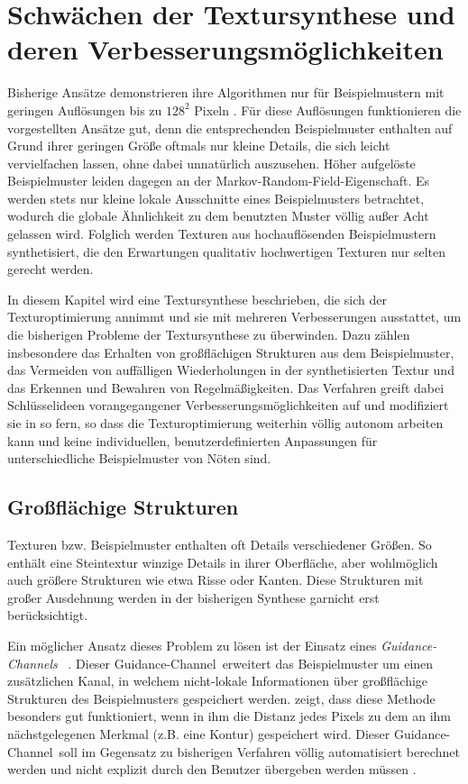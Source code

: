 \section{Schwächen der Textursynthese und deren Verbesserungsmöglichkeiten}

Bisherige Ansätze demonstrieren ihre Algorithmen nur für Beispielmustern mit geringen Auflösungen bis zu $128^2$ Pixeln \cite{SelfTuning}.
Für diese Auflösungen funktionieren die vorgestellten Ansätze gut, denn die entsprechenden Beispielmuster enthalten auf Grund ihrer geringen Größe oftmals nur kleine Details, die sich leicht vervielfachen lassen, ohne dabei unnatürlich auszusehen.
Höher aufgelöste Beispielmuster leiden dagegen an der \glqq Markov-Random-Field\grqq -Eigenschaft.
Es werden stets nur kleine lokale Ausschnitte eines Beispielmusters betrachtet, wodurch die globale Ähnlichkeit zu dem benutzten Muster völlig außer Acht gelassen wird.
Folglich werden Texturen aus hochauflösenden Beispielmustern synthetisiert, die den Erwartungen qualitativ hochwertigen Texturen nur selten gerecht werden.

In diesem Kapitel wird eine Textursynthese beschrieben, die sich der Texturoptimierung annimmt und sie mit mehreren Verbesserungen ausstattet, um die bisherigen Probleme der Textursynthese zu überwinden.
Dazu zählen insbesondere das Erhalten von großflächigen Strukturen aus dem Beispielmuster, das Vermeiden von auffälligen Wiederholungen in der synthetisierten Textur und das Erkennen und Bewahren von Regelmäßigkeiten.
Das Verfahren greift dabei Schlüsselideen vorangegangener Verbesserungsmöglichkeiten auf und modifiziert sie in so fern, so dass die Texturoptimierung weiterhin völlig autonom arbeiten kann und keine individuellen, benutzerdefinierten Anpassungen für unterschiedliche Beispielmuster von Nöten sind.

\subsection{Großflächige Strukturen}

Texturen bzw. Beispielmuster enthalten oft Details verschiedener Größen.
So enthält eine Steintextur winzige Details in ihrer Oberfläche, aber wohlmöglich auch größere Strukturen wie etwa Risse oder Kanten.
Diese Strukturen mit großer Ausdehnung werden in der bisherigen Synthese garnicht erst berücksichtigt.

Ein möglicher Ansatz dieses Problem zu lösen ist der Einsatz eines \emph{\glqq Guidance-Channels\grqq} \ \cite{SelfTuning}.
Dieser \glqq Guidance-Channel\grqq \ erweitert das Beispielmuster um einen zusätzlichen Kanal, in welchem nicht-lokale Informationen über großflächige Strukturen des Beispielmusters gespeichert werden.
\cite{Guidance} zeigt, dass diese Methode besonders gut funktioniert, wenn in ihm die Distanz jedes Pixels zu dem an ihm nächstgelegenen Merkmal (z.B. eine Kontur)  gespeichert wird.
Dieser \glqq Guidance-Channel\grqq \ soll im Gegensatz zu bisherigen Verfahren völlig automatisiert berechnet werden und nicht explizit durch den Benutzer übergeben werden müssen \cite{SelfTuning}.

